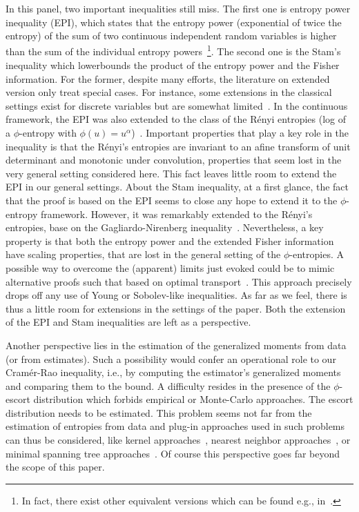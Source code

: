 \documentclass[entropy,article,submit,moreauthors,pdftex]{Definitions/mdpi}
\newcommand{\SZ}[1]{{\color{blue} #1}}                                       %
\begin{document}
\SZ{In  this panel,  two important  inequalities still  miss. The  first one  is
  entropy  power  inequality   (EPI),  which  states  that   the  entropy  power
  (exponential of  twice the entropy) of  the sum of two  continuous independent
  random  variables   is  higher  than   the  sum  of  the   individual  entropy
  powers~\footnote{\SZ{In fact, there exist  other equivalent versions which can
    be found e.g., in~\cite{CovTho06, DemCov91}.}}. The second one is the Stam's
  inequality which lowerbounds  the product of the entropy power  and the Fisher
  information. For the former, despite  many efforts, the literature on extended
  version  only treat  special  cases.   For instance,  some  extensions in  the
  classical   settings   exist  for   discrete   variables   but  are   somewhat
  limited~\cite{HarVig03, JohYu10,  HagAbb14}. In the continuous  framework, the
  EPI  was also  extended  to the  class  of  the R\'enyi  entropies  (log of  a
  $\phi$-entropy   with   $\phi(u)  =   u^\alpha$)~\cite{BobChi15}.    Important
  properties  that play  a key  role  in the  inequality is  that the  R\'enyi's
  entropies  are  invariant  to  an  afine transform  of  unit  determinant  and
  monotonic under  convolution, properties  that seem lost  in the  very general
  setting considered here. This fact leaves little room to extend the EPI in our
  general settings. About the Stam inequality,  at a first glance, the fact that
  the proof  is based on  the EPI seems  to close any hope  to extend it  to the
  $\phi$-entropy framework. However, it was remarkably extended to the R\'enyi's
  entropies,  base   on  the   Gagliardo-Nirenberg  inequality~\cite{Ber12:06_1,
    LutYan05, LutLv12, ZozPue17}. Nevertheless, a  key property is that both the
  entropy power  and the  extended Fisher  information have  scaling properties,
  that are lost  in the general setting of the  $\phi$-entropies. A possible way
  to overcome  the (apparent) limits just  evoked could be to  mimic alternative
  proofs  such  that based  on  optimal  transport~\cite{Rio17}.  This  approach
  precisely drops off  any use of Young or Sobolev-like  inequalities. As far as
  we feel,  there is thus a  little room for  extensions in the settings  of the
  paper. Both  the extension  of the  EPI and  Stam inequalities  are left  as a
  perspective.}

Another perspective lies in the estimation  of the generalized moments from data
(or from estimates). Such a possibility  would confer an operational role to our
Cram\'er-Rao inequality, i.e., by  computing the estimator's generalized moments
and comparing  them to the  bound. A difficulty resides  in the presence  of the
$\phi$-escort    distribution   which    forbids   empirical    or   Monte-Carlo
approaches. The escort  distribution needs to be estimated.   This problem seems
not far from  the estimation of entropies from data  and plug-in approaches used
in such  problems can  thus be  considered, like  kernel approaches~\cite{Ros56,
  Par62,  BeiDud97}, nearest  neighbor approaches~\cite{LeoPro08,  BeiDud97}, or
minimal spanning tree approaches~\cite{HerMa02}. Of course this perspective goes
far beyond the scope of this paper.
\end{document}
